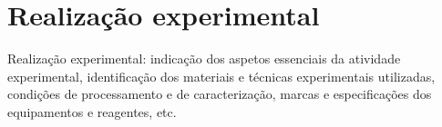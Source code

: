 \section{Realização experimental}

Realização experimental: indicação dos aspetos essenciais da atividade experimental, identificação dos materiais e técnicas experimentais utilizadas, condições de processamento e de caracterização, marcas e especificações dos equipamentos e reagentes, etc.
